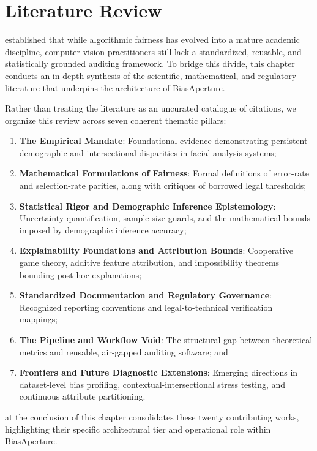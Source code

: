 \chapter{Literature Review}
\label{chap:litreview}

 established that while algorithmic fairness has evolved into a mature academic discipline, computer vision practitioners still lack a standardized, reusable, and statistically grounded auditing framework. To bridge this divide, this chapter conducts an in-depth synthesis of the scientific, mathematical, and regulatory literature that underpins the architecture of BiasAperture. 

Rather than treating the literature as an uncurated catalogue of citations, we organize this review across seven coherent thematic pillars:
\begin{enumerate}
    \item \textbf{The Empirical Mandate}: Foundational evidence demonstrating persistent demographic and intersectional disparities in facial analysis systems;
    \item \textbf{Mathematical Formulations of Fairness}: Formal definitions of error-rate and selection-rate parities, along with critiques of borrowed legal thresholds;
    \item \textbf{Statistical Rigor and Demographic Inference Epistemology}: Uncertainty quantification, sample-size guards, and the mathematical bounds imposed by demographic inference accuracy;
    \item \textbf{Explainability Foundations and Attribution Bounds}: Cooperative game theory, additive feature attribution, and impossibility theorems bounding post-hoc explanations;
    \item \textbf{Standardized Documentation and Regulatory Governance}: Recognized reporting conventions and legal-to-technical verification mappings;
    \item \textbf{The Pipeline and Workflow Void}: The structural gap between theoretical metrics and reusable, air-gapped auditing software; and
    \item \textbf{Frontiers and Future Diagnostic Extensions}: Emerging directions in dataset-level bias profiling, contextual-intersectional stress testing, and continuous attribute partitioning.
\end{enumerate}

 at the conclusion of this chapter consolidates these twenty contributing works, highlighting their specific architectural tier and operational role within BiasAperture.


